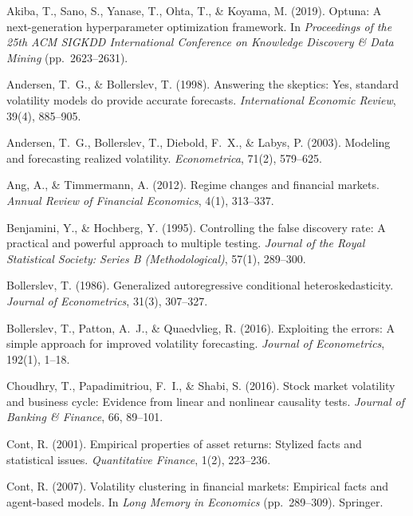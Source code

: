 \documentclass{article}
\begin{document}
\small
\begin{description}[leftmargin=1.5em,labelindent=0pt,style=unboxed,itemsep=0.2em,topsep=0.2em]

\item Akiba, T., Sano, S., Yanase, T., Ohta, T., \& Koyama, M. (2019). Optuna: A next-generation hyperparameter optimization framework. In \emph{Proceedings of the 25th ACM SIGKDD International Conference on Knowledge Discovery \& Data Mining} (pp.\ 2623--2631).

\item Andersen, T.~G., \& Bollerslev, T. (1998). Answering the skeptics: Yes, standard volatility models do provide accurate forecasts. \emph{International Economic Review}, 39(4), 885--905.

\item Andersen, T.~G., Bollerslev, T., Diebold, F.~X., \& Labys, P. (2003). Modeling and forecasting realized volatility. \emph{Econometrica}, 71(2), 579--625.

\item Ang, A., \& Timmermann, A. (2012). Regime changes and financial markets. \emph{Annual Review of Financial Economics}, 4(1), 313--337.

\item Benjamini, Y., \& Hochberg, Y. (1995). Controlling the false discovery rate: A practical and powerful approach to multiple testing. \emph{Journal of the Royal Statistical Society: Series B (Methodological)}, 57(1), 289--300.

\item Bollerslev, T. (1986). Generalized autoregressive conditional heteroskedasticity. \emph{Journal of Econometrics}, 31(3), 307--327.

\item Bollerslev, T., Patton, A.~J., \& Quaedvlieg, R. (2016). Exploiting the errors: A simple approach for improved volatility forecasting. \emph{Journal of Econometrics}, 192(1), 1--18.

\item Choudhry, T., Papadimitriou, F.~I., \& Shabi, S. (2016). Stock market volatility and business cycle: Evidence from linear and nonlinear causality tests. \emph{Journal of Banking \& Finance}, 66, 89--101.

\item Cont, R. (2001). Empirical properties of asset returns: Stylized facts and statistical issues. \emph{Quantitative Finance}, 1(2), 223--236.

\item Cont, R. (2007). Volatility clustering in financial markets: Empirical facts and agent-based models. In \emph{Long Memory in Economics} (pp.\ 289--309). Springer.


\end{description}
\end{document}
